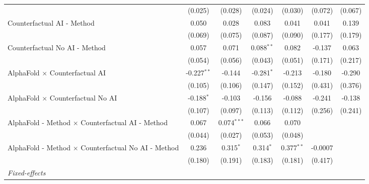 \begin{tabular}{lcccccc}
                                                              & (0.025)       & (0.028)       & (0.024)       & (0.030)       & (0.072)       & (0.067)\\   
   Counterfactual AI - Method                                 & 0.050         & 0.028         & 0.083         & 0.041         & 0.041         & 0.139\\   
                                                              & (0.069)       & (0.075)       & (0.087)       & (0.090)       & (0.177)       & (0.179)\\   
   Counterfactual No AI - Method                              & 0.057         & 0.071         & 0.088$^{**}$  & 0.082         & -0.137        & 0.063\\   
                                                              & (0.054)       & (0.056)       & (0.043)       & (0.051)       & (0.171)       & (0.217)\\   
   AlphaFold $\times$ Counterfactual AI                       & -0.227$^{**}$ & -0.144        & -0.281$^{*}$  & -0.213        & -0.180        & -0.290\\   
                                                              & (0.105)       & (0.106)       & (0.147)       & (0.152)       & (0.431)       & (0.376)\\   
   AlphaFold $\times$ Counterfactual No AI                    & -0.188$^{*}$  & -0.103        & -0.156        & -0.088        & -0.241        & -0.138\\   
                                                              & (0.107)       & (0.097)       & (0.113)       & (0.112)       & (0.256)       & (0.241)\\   
   AlphaFold - Method $\times$ Counterfactual AI - Method     & 0.067         & 0.074$^{***}$ & 0.066         & 0.070         &               &   \\   
                                                              & (0.044)       & (0.027)       & (0.053)       & (0.048)       &               &   \\   
   AlphaFold - Method $\times$ Counterfactual No AI - Method  & 0.236         & 0.315$^{*}$   & 0.314$^{*}$   & 0.377$^{**}$  & -0.0007       &   \\   
                                                              & (0.180)       & (0.191)       & (0.183)       & (0.181)       & (0.417)       &   \\   
   \midrule
   \emph{Fixed-effects}\\

\end{tabular}
